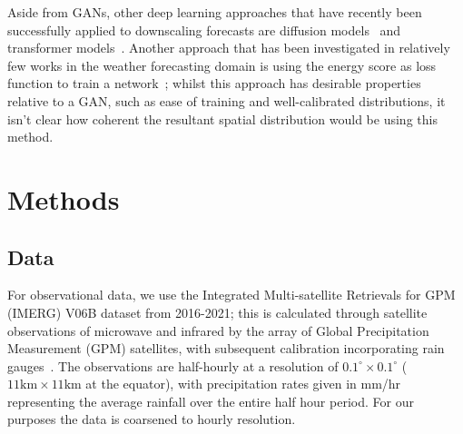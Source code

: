 \documentclass{article}
\begin{document}
Aside from GANs, other deep learning approaches that have recently been successfully applied to downscaling forecasts are diffusion models~\citep{li_seeds_2023, addison_machine_2022, leinonen_latent_2023} and transformer models~\citep{ben-bouallegue_improving_2023}. Another approach that has been investigated in relatively few works in the weather forecasting domain is using the energy score as loss function to train a network~\cite{pacchiardi_probabilistic_2021}; whilst this approach has desirable properties relative to a GAN, such as ease of training and well-calibrated distributions, it isn't clear how coherent the resultant spatial distribution would be using this method. 


\section{Methods}
\subsection{Data}

\label{sec:data}


For observational data, we use the Integrated Multi-satellite Retrievals for GPM (IMERG) V06B dataset from 2016-2021; this is calculated through satellite observations of microwave and infrared by the array of Global Precipitation Measurement (GPM) satellites, with subsequent calibration incorporating rain gauges~\citep{huffman_integrated_2023}. The observations are half-hourly at a resolution of $0.1^{\circ} \times 0.1^{\circ}$ ($11\text{km} \times 11\text{km}$ at the equator), with precipitation rates given in mm/hr representing the average rainfall over the entire half hour period. For our purposes the data is coarsened to hourly resolution.
\end{document}
